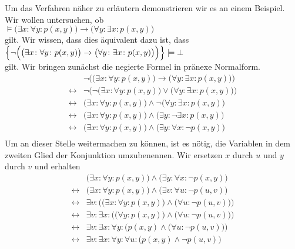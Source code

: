 Um das Verfahren näher zu erläutern demonstrieren wir es an einem Beispiel. 
Wir wollen untersuchen, ob \\[0.2cm]
\hspace*{1.3cm} 
$\models \big(\exists x\colon \forall y\colon  p(x,y)\big) \rightarrow \big(\forall y\colon \exists x\colon p(x,y)\big)$ \\[0.2cm]
gilt.  Wir wissen, dass dies äquivalent dazu ist, dass  \\[0.2cm]
\hspace*{1.3cm} 
$\Big\{ \neg \Big(\big(\exists x\colon \forall y\colon  p(x,y)\big) \rightarrow  \big(\forall y\colon \exists x\colon p(x,y)\big)\Big)\Big\} \models \bot$ \\[0.2cm]
gilt.  Wir bringen zunächst die negierte Formel in pränexe Normalform. 
$$
\begin{array}{ll}
                  & \neg \Big(\big(\exists x\colon \forall y\colon  p(x,y)\big) \rightarrow \big(\forall y\colon \exists x\colon p(x,y)\big)\Big) \\
  \leftrightarrow & \neg \Big(\neg \big(\exists x\colon \forall y\colon  p(x,y)\big) \vee \big(\forall y\colon \exists x\colon p(x,y)\big)\Big) \\
  \leftrightarrow &                \big(\exists x\colon \forall y\colon  p(x,y)\big) \wedge \neg \big(\forall y\colon \exists x\colon p(x,y)\big) \\
  \leftrightarrow &\big(\exists x\colon \forall y\colon  p(x,y)\big) \wedge  \big(\exists y\colon  \neg \exists x\colon p(x,y)\big) \\
  \leftrightarrow &\big(\exists x\colon \forall y\colon  p(x,y)\big) \wedge  \big(\exists y\colon  \forall x\colon \neg p(x,y)\big) \\
\end{array}
$$
Um an dieser Stelle weitermachen zu können, ist es nötig, die Variablen in dem  zweiten
Glied der Konjunktion umzubenennen.  Wir ersetzen $x$ durch $u$ und $y$ durch $v$ und erhalten
$$
\begin{array}{ll}
                  &\big(\exists x\colon \forall y\colon  p(x,y)\big) \wedge  \big(\exists y\colon  \forall x\colon \neg p(x,y)\big) \\
  \leftrightarrow &\big(\exists x\colon \forall y\colon  p(x,y)\big) \wedge  \big(\exists v\colon  \forall u\colon \neg p(u,v)\big) \\
  \leftrightarrow &\exists v\colon  \Big( \big(\exists x\colon \forall y\colon  p(x,y)\big) \wedge  \big(\forall u\colon \neg p(u,v)\big) \Big)\\
  \leftrightarrow &\exists v\colon  \exists x\colon  \Big( \big(\forall y\colon  p(x,y)\big) \wedge \big(\forall u\colon \neg p(u,v)\big) \Big)\\
  \leftrightarrow &\exists v\colon  \exists x\colon \forall y\colon \Big( p(x,y) \wedge \big(\forall u\colon \neg p(u,v)\big) \Big)\\
  \leftrightarrow &\exists v\colon  \exists x\colon \forall y\colon \forall u\colon \Big( p(x,y) \wedge \neg p(u,v) \Big)\\
\end{array}
$$
